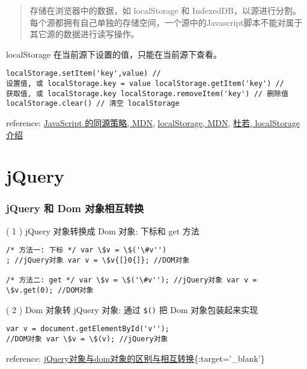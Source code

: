\begin{quote}
存储在浏览器中的数据，如 localStorage 和
IndexedDB，以源进行分割。每个源都拥有自己单独的存储空间，一个源中的Javascript脚本不能对属于其它源的数据进行读写操作。
\end{quote}

localStorage 在当前源下设置的值，只能在当前源下查看。

\begin{verbatim}localStorage.setItem('key',value) //
设置值, 或 localStorage.key = value localStorage.getItem('key') //
获取值, 或 localStorage.key localStorage.removeItem('key') // 删除值
localStorage.clear() // 清空 localStorage 
\end{verbatim}

reference:
\href{https://developer.mozilla.org/zh-CN/docs/Web/Security/Same-origin_policy}{JavaScript
的同源策略, MDN},
\href{https://developer.mozilla.org/en-US/docs/Web/API/Storage/LocalStorage}{localStorage,
MDN},
\href{http://wikieswan.github.io/javascript/2015/04/03/html5-api-localstorage/}{杜若,
localStorage 介绍}

\section{jQuery}\label{jquery}

\subsubsection{jQuery 和 Dom
对象相互转换}\label{jquery-ux548c-dom-ux5bf9ux8c61ux76f8ux4e92ux8f6cux6362}

( 1 ) jQuery 对象转换成 Dom 对象: 下标和 get 方法

\begin{verbatim}/* 方法一: 下标 */ var \$v = \$('\#v'')
; //jQuery对象 var v = \$v{[}0{]}; //DOM对象

/* 方法二: get */ var \$v = \$('\#v''); //jQuery对象 var v =
\$v.get(0); //DOM对象 
\end{verbatim}

( 2 ) Dom 对象转 jQuery 对象: 通过 \texttt{\$()} 把 Dom 对象包装起来实现

\begin{verbatim}var v = document.getElementById('v'');
//DOM对象 var \$v = \$(v); //jQuery对象 
\end{verbatim}

reference:
\href{http://segmentfault.com/a/1190000003710344}{jQuery对象与dom对象的区别与相互转换}\{:target='\_blank'\}

